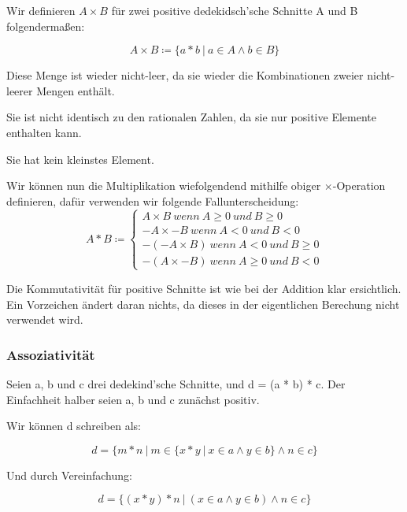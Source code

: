 \documentclass[12pt]{article}
\begin{document}
    Wir definieren $A \times B$ für zwei positive dedekidsch'sche Schnitte A und B folgendermaßen:

    \[A \times B \coloneqq \{a * b \mspace{4mu} | \mspace{4mu} a \in A \land b \in B\}\]

    Diese Menge ist wieder nicht-leer, da sie wieder die Kombinationen zweier nicht-leerer Mengen enthält.

    Sie ist nicht identisch zu den rationalen Zahlen, da sie nur positive Elemente enthalten kann.

    Sie hat kein kleinstes Element.

    Wir können nun die Multiplikation wiefolgendend mithilfe obiger $\times$-Operation definieren,
    dafür verwenden wir folgende Fallunterscheidung:
    \[
        A * B \coloneqq
        \begin{cases}
            A \times B \mspace{4mu} wenn \mspace{4mu} A \ge 0 \mspace{4mu} und \mspace{4mu} B \ge 0 \\
            -A \times -B \mspace{4mu} wenn \mspace{4mu} A < 0 \mspace{4mu} und \mspace{4mu} B < 0 \\
            -(-A \times B) \mspace{4mu} wenn \mspace{4mu} A < 0 \mspace{4mu} und \mspace{4mu} B \ge 0  \\
            -(A \times -B) \mspace{4mu} wenn \mspace{4mu} A \ge 0 \mspace{4mu} und \mspace{4mu} B < 0
        \end{cases}
    \]

    Die Kommutativität für positive Schnitte ist wie bei der Addition klar ersichtlich.
    Ein Vorzeichen ändert daran nichts, da dieses in der eigentlichen Berechung nicht verwendet wird.

    \subsubsection{Assoziativität}

    Seien a, b und c drei dedekind'sche Schnitte, und d = (a * b) * c.
    Der Einfachheit halber seien a, b und c zunächst positiv.

    Wir können d schreiben als:

    \[d = \{m * n \mspace{4mu} | \mspace{4mu} m \in \{x * y \mspace{4mu} | \mspace{4mu} x \in a \land y \in b\} \land n \in c\}\]

    Und durch Vereinfachung:

    \[d = \{(x * y) * n \mspace{4mu} | \mspace{4mu} (x \in a \land y \in b) \land n \in c\}\]
\end{document}
